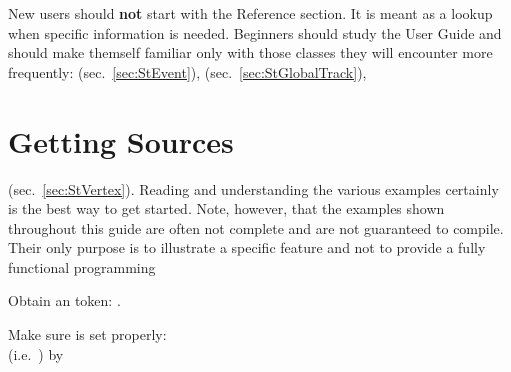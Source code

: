 New users should \textbf{not} start with the Reference section. It is
meant as a lookup when specific information is needed. Beginners
should study the User Guide and should make themself familiar only
with those classes they will encounter more frequently: 
(sec.~\ref{sec:StEvent}), 
(sec.~\ref{sec:StGlobalTrack}), 
\section{Getting \StEvent Sources}  
(sec.~\ref{sec:StVertex}).  Reading and understanding the various
examples certainly is the best way to get started. Note, however, that
the examples shown throughout this guide are often not complete and
are not guaranteed to compile. Their only purpose is to illustrate a
specific feature and not to provide a fully functional programming
  \item Obtain an  token: .
  \item Make sure  is set properly:\\
    (i.e.~)
     \advance\leftmargin by %
\label{sec:furtherdoc}


